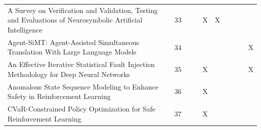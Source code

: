 \begin{landscape}
\begin{longtable}{|p{17cm}|c|c|c|c|c|c|c|c|c|}
		A Survey on Verification and Validation, Testing and Evaluations of Neurosymbolic Artificial Intelligence                                               & 33          &                                    &                                                           & X                                                     & X                                                          &                                           &                                              &                                                    &                                    \\
		Agent-SiMT: Agent-Assisted Simultaneous Translation With Large Language Models                                                                          & 34          &                                    &                                                           &                                                       &                                                            &                                           &                                              &                                                    & X                                  \\
		An Effective Iterative Statistical Fault Injection Methodology for Deep Neural Networks                                                                 & 35          &                                    &                                                           & X                                                     &                                                            &                                           &                                              &                                                    & X                                  \\
		Anomalous State Sequence Modeling to Enhance Safety in Reinforcement Learning                                                                           & 36          &                                    &                                                           & X                                                     &                                                            &                                           &                                              &                                                    &                                    \\
		CVaR-Constrained Policy Optimization for Safe Reinforcement Learning                                                                                    & 37          &                                    &                                                           & X                                                     &                                                            &                                           &                                              &                                                    &                                    \\

\end{longtable}
\end{landscape}
